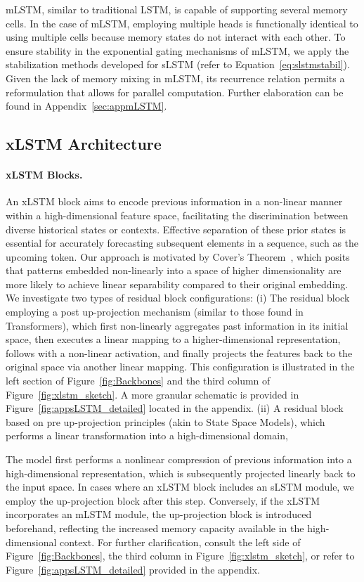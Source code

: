 mLSTM, similar to traditional LSTM, is capable of supporting several memory cells. In the case of mLSTM, employing multiple heads is functionally identical to using multiple cells because memory states do not interact with each other. To ensure stability in the exponential gating mechanisms of mLSTM, we apply the stabilization methods developed for sLSTM (refer to Equation~\ref{eq:slstmstabil}). Given the lack of memory mixing in mLSTM, its recurrence relation permits a reformulation that allows for parallel computation. Further elaboration can be found in Appendix~\ref{sec:appmLSTM}.

\subsection{xLSTM Architecture}
\label{sec:xLSTMarch}

\paragraph{xLSTM Blocks.}
\label{sec:xLSTMblock}
An xLSTM block aims to encode previous information in a non-linear manner within a high-dimensional feature space, facilitating the discrimination between diverse historical states or contexts. Effective separation of these prior states is essential for accurately forecasting subsequent elements in a sequence, such as the upcoming token. Our approach is motivated by Cover’s Theorem~\citep{Cover:65}, which posits that patterns embedded non-linearly into a space of higher dimensionality are more likely to achieve linear separability compared to their original embedding. We investigate two types of residual block configurations: (i) The residual block employing a post up-projection mechanism (similar to those found in Transformers), which first non-linearly aggregates past information in its initial space, then executes a linear mapping to a higher-dimensional representation, follows with a non-linear activation, and finally projects the features back to the original space via another linear mapping. This configuration is illustrated in the left section of Figure~\ref{fig:Backbones} and the third column of Figure~\ref{fig:xlstm_sketch}. A more granular schematic is provided in Figure~\ref{fig:appsLSTM_detailed} located in the appendix. (ii) A residual block based on pre up-projection principles (akin to State Space Models), which performs a linear transformation into a high-dimensional domain,

The model first performs a nonlinear compression of previous information into a high-dimensional representation, which is subsequently projected linearly back to the input space. In cases where an xLSTM block includes an sLSTM module, we employ the up-projection block after this step. Conversely, if the xLSTM incorporates an mLSTM module, the up-projection block is introduced beforehand, reflecting the increased memory capacity available in the high-dimensional context. For further clarification, consult the left side of Figure~\ref{fig:Backbones}, the third column in Figure~\ref{fig:xlstm_sketch}, or refer to Figure~\ref{fig:appsLSTM_detailed} provided in the appendix.

